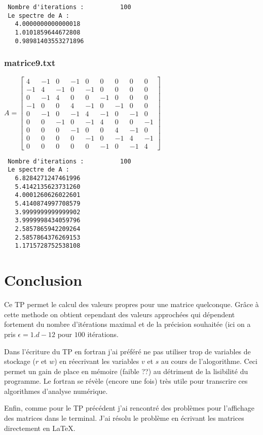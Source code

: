\documentclass{report}
\begin{document}
\begin{small}
\begin{verbatim}
 Nombre d'iterations :          100
 Le spectre de A : 
   4.0000000000000018     
   1.0101859644672808     
   0.98981403553271896 
\end{verbatim}
\end{small}

\subsubsection{matrice9.txt}
$A=\left[\begin{array}{rrrrrrrrr}
 4 & -1 &  0 & -1 &  0 &  0 &  0 &  0 &  0 \\
-1 &  4 & -1 &  0 & -1 &  0 &  0 &  0 &  0 \\
 0 & -1 &  4 &  0 &  0 & -1 &  0 &  0 &  0 \\
-1 &  0 &  0 &  4 & -1 &  0 & -1 &  0 &  0 \\
 0 & -1 &  0 & -1 &  4 & -1 &  0 & -1 &  0 \\
 0 &  0 & -1 &  0 & -1 &  4 &  0 &  0 & -1 \\
 0 &  0 &  0 & -1 &  0 &  0 &  4 & -1 &  0 \\
 0 &  0 &  0 &  0 & -1 &  0 & -1 &  4 & -1 \\
 0 &  0 &  0 &  0 &  0 & -1 &  0 & -1 &  4
\end{array}\right]$

\begin{small}
\begin{verbatim}
 Nombre d'iterations :          100
 Le spectre de A : 
   6.8284271247461996     
   5.4142135623731260     
   4.0001260626022601     
   5.4140874997708579     
   3.9999999999999902     
   3.9999998434059796     
   2.5857865942209264     
   2.5857864376269153     
   1.1715728752538108 
\end{verbatim}
\end{small}

\newpage
\section{Conclusion}\label{conclusion}
Ce TP permet le calcul des valeurs propres pour une matrice quelconque. Grâce à cette methode
on obtient cependant des valeurs approchées qui dépendent fortement du nombre d'itérations maximal
et de la précision souhaitée (ici on a pris $\epsilon{} = 1.d-12$ pour $100$ itérations.

Dans l'écriture du TP en fortran j'ai préféré ne pas utiliser trop de variables de stockage ($r$ et $w$) en
réecrivant les variables $v$ et $s$ au cours de l'alogorithme. Ceci permet un gain de place en mémoire (faible ??)
au détriment de la lisibilité du programme. Le fortran se révèle (encore une fois) très utile pour transcrire
ces algorithmes d'analyse numérique.

Enfin, comme pour le TP précédent j'ai rencontré des problèmes pour l'affichage des matrices dans le terminal.
J'ai résolu le problème en écrivant les matrices directement en \LaTeX{}.
\end{document}

